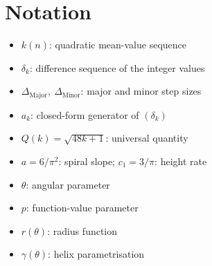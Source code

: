 \section*{Notation}

\begin{itemize}[leftmargin=2em]
\item $k(n)$: quadratic mean-value sequence
\item $\delta_k$: difference sequence of the integer values
\item $\Delta_{\mathrm{Major}},\ \Delta_{\mathrm{Minor}}$: major and minor step sizes
\item $a_k$: closed-form generator of $(\delta_k)$
\item $Q(k) = \sqrt{48k+1}$: universal quantity
\item $a = 6/\pi^2$: spiral slope; $c_1 = 3/\pi$: height rate
\item $\theta$: angular parameter
\item $p$: function-value parameter
\item $r(\theta)$: radius function
\item $\gamma(\theta)$: helix parametrisation
\end{itemize}
